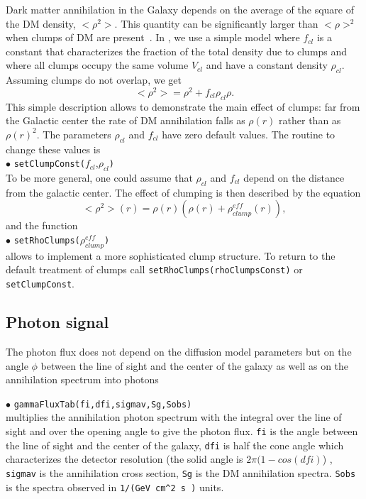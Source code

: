 \documentclass[12pt,a4paper]{article}
\begin{document}
Dark matter annihilation in the Galaxy depends on the average of the square of the DM density, $<\rho^2>$. This quantity 
can be significantly larger than $<\rho>^2$ when clumps of DM are present~\cite{Lavalle:2006vb}.  
In \micro,   we use  a simple model where $f_{cl}$ is a constant 
that characterizes the fraction of the total density due to clumps
 and  where all clumps occupy  the
same volume $V_{cl}$ and have a constant density $\rho_{cl}$. Assuming  clumps do not  overlap, we get 
\begin{equation} 
    <\rho^2> = \rho^2 +  f_{cl}\rho_{cl}\rho .
\end{equation}
This simple description allows to  demonstrate  the main effect of clumps:  far from the Galactic center the rate of DM annihilation falls as $\rho(r)$ rather than as
$\rho(r)^2$. The parameters $\rho_{cl}$  and  $f_{cl}$ have zero default values.  
The routine to change these values is \\
 \noindent $\bullet$ \verb|setClumpConst(|$f_{cl}$,$\rho_{cl}$\verb|)| \\
To be more general, one could assume that $\rho_{cl}$  and  $f_{cl}$  depend on the distance from the galactic center. The effect of clumping  is then described  by the equation 
\begin{equation}
<\rho^2>(r)=\rho(r)(\rho(r) +  \rho_{clump}^{eff}(r)),
\end{equation}
and the function \\
\noindent $\bullet$ \verb|setRhoClumps(|$\rho_{clump}^{eff}$\verb|)|\\
allows to implement a more sophisticated clump  structure. To return to the default  treatment of clumps call
\verb|setRhoClumps(rhoClumpsConst)| or \verb|setClumpConst|.


\subsection{Photon  signal}
The photon  flux does not depend on the  diffusion model parameters but on the angle
$\phi$ between the line of sight and the center of the galaxy as well as on the annihilation spectrum
into photons

\noindent
$\bullet$ \verb|gammaFluxTab(fi,dfi,sigmav,Sg,Sobs)|\\
multiplies the annihilation photon spectrum  with the integral over the line of sight
and over the opening angle to give the photon flux. 
\verb|fi| is the angle between the line of sight and the center of the
galaxy,   \verb|dfi| is half the cone angle which characterizes the detector resolution
(the solid angle is  $2\pi (1-cos(dfi)$) ,  
 \verb|sigmav| is the annihilation cross section, \verb|Sg| is the DM annihilation spectra.
\verb|Sobs| is the spectra observed in \verb|1/(GeV cm^2 s )| units. 
\end{document}
